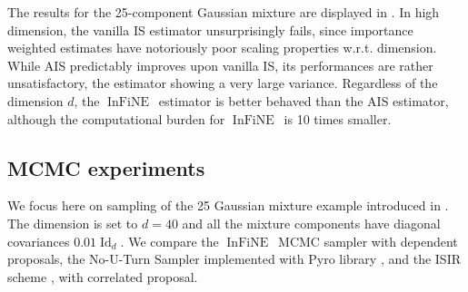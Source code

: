 \documentclass{article}
\def\IFIS{\ensuremath{\operatorname{InFiNE}}}
\def\InFiNE{{\small \IFIS}}
\def\Id{\operatorname{Id}}
\newcommand{\1}{\mathds{1}}
\def\Id{\operatorname{Id}}
\def\Id{\operatorname{Id}}
\begin{document}
The results for the 25-component Gaussian mixture are displayed in . In high dimension, the vanilla IS estimator unsurprisingly fails, since importance weighted estimates have notoriously poor scaling properties w.r.t. dimension. While AIS predictably improves upon vanilla IS, its performances are rather unsatisfactory, the estimator showing a very large variance. Regardless of the dimension $d$, the \IFIS\ estimator  is better behaved than the AIS estimator, although the computational burden for \IFIS\ is 10 times smaller.

\subsection{MCMC experiments}
\label{subsec:mcmc_exp}
We focus here on sampling of the 25 Gaussian mixture example introduced in . The dimension is set to $d=40$  and all the mixture components have diagonal covariances  $0.01 \Id_d$.
We compare the \InFiNE\ MCMC sampler with dependent proposals,
the No-U-Turn Sampler implemented with Pyro library \cite{bingham2019pyro},
and the ISIR scheme \cite{andrieu2010particle, andrieu2018uniform}, with correlated proposal.
\end{document}
